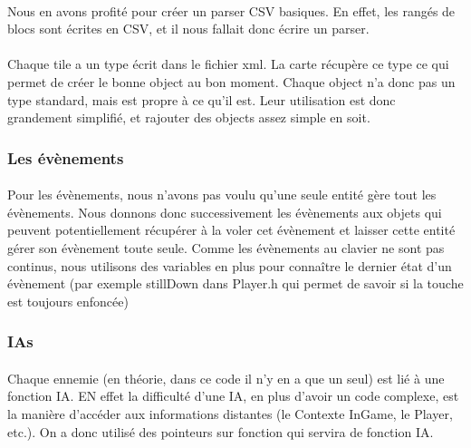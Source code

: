 \paragraph{} Nous en avons profité pour créer un parser CSV basiques. En effet, les rangés de blocs sont écrites en CSV, et il nous fallait donc écrire un parser.
\paragraph{} Chaque tile a un type écrit dans le fichier xml. La carte récupère ce type ce qui permet de créer le bonne object au bon moment. Chaque object n'a donc pas un type standard, mais est propre à ce qu'il est. Leur utilisation est donc grandement simplifié, et rajouter des objects assez simple en soit.

\subsubsection{Les évènements}

\paragraph{} Pour les évènements, nous n'avons pas voulu qu'une seule entité gère tout les évènements. Nous donnons donc successivement les évènements aux objets qui peuvent potentiellement récupérer à la voler cet évènement et laisser cette entité gérer son évènement toute seule. Comme les évènements au clavier ne sont pas continus, nous utilisons des variables en plus pour connaître le dernier état d'un évènement (par exemple stillDown dans Player.h qui permet de savoir si la touche est toujours enfoncée)

\subsubsection{IAs}

\paragraph{} Chaque ennemie (en théorie, dans ce code il n'y en a que un seul) est lié à une fonction IA. EN effet la difficulté d'une IA, en plus d'avoir un code complexe, est la manière d'accéder aux informations distantes (le Contexte InGame, le Player, etc.). On a donc utilisé des pointeurs sur fonction qui servira de fonction IA.
